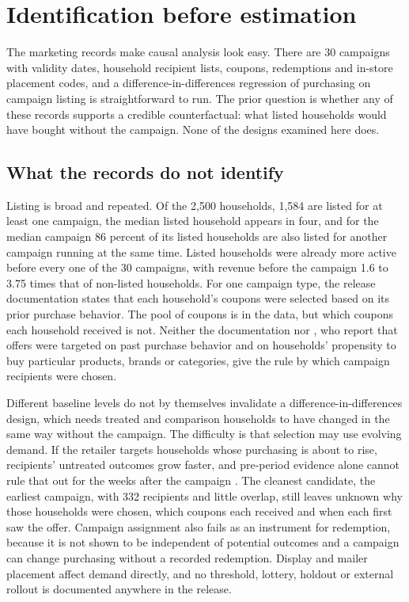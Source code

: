 \documentclass[11pt]{article}
\begin{document}
\section{Identification before estimation}
\label{sec:identification}

The marketing records make causal analysis look easy. There are 30 campaigns with validity
dates, household recipient lists, coupons, redemptions and in-store placement codes, and a
difference-in-differences regression of purchasing on campaign listing is straightforward to
run. The prior question is whether any of these records supports a credible counterfactual:
what listed households would have bought without the campaign. None of the designs examined
here does.

\subsection{What the records do not identify}

Listing is broad and repeated. Of the 2,500 households, 1,584 are listed for at least one
campaign, the median listed household appears in four, and for the median campaign 86 percent
of its listed households are also listed for another campaign running at the same time. Listed
households were already more active before every one of the 30 campaigns, with revenue before
the campaign 1.6 to 3.75 times that of non-listed households. For one campaign type, the release documentation states that
each household's coupons were selected based on its prior purchase behavior. The pool of
coupons is in the data, but which coupons each household received is not. Neither the
documentation nor \citet{guan_atlas_vadiveloo}, who report that offers were targeted on past
purchase behavior and on households' propensity to buy particular products, brands or
categories, give the rule by which campaign recipients were chosen.

Different baseline levels do not by themselves invalidate a difference-in-differences design,
which needs treated and comparison households to have changed in the same way without the
campaign. The difficulty is that selection may use evolving demand. If the retailer targets
households whose purchasing is about to rise, recipients' untreated outcomes grow faster, and
pre-period evidence alone cannot rule that out for the weeks after the campaign
\citep{roth2022,rambachan_roth,roth_survey}. The cleanest candidate, the earliest campaign, with 332
recipients and little overlap, still leaves unknown why those households were chosen, which
coupons each received and when each first saw the offer. Campaign assignment also fails as an instrument for redemption, because
it is not shown to be independent of potential outcomes and a campaign can change purchasing
without a recorded redemption. Display and mailer placement affect demand directly, and no
threshold, lottery, holdout or external rollout is documented anywhere in the release.
\end{document}
